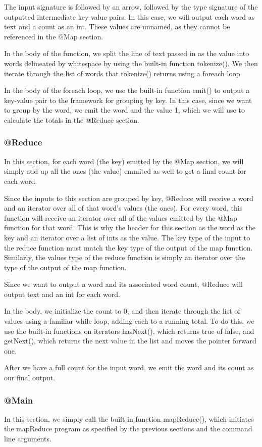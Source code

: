 \documentclass{article}
\begin{document}
The input signature is followed by an arrow, followed by the type signature of the outputted intermediate key-value pairs. In this case, we will output each word as text and a count as an int. These values are unnamed, as they cannot be referenced in the @Map section.

In the body of the function, we split the line of text passed in as the value into words delineated by whitespace by using the built-in function tokenize(). We then iterate through the list of words that tokenize() returns using a foreach loop. 

In the body of the foreach loop, we use the built-in function emit() to output a key-value pair to the framework for grouping by key. In this case, since we want to group by the word, we emit the word and the value 1, which we will use to calculate the totals in the @Reduce section.

\subsubsection*{@Reduce}
In this section, for each word (the key) emitted by the @Map section, we will simply add up all the ones (the value) emmited as well to get a final count for each word. 

Since the inputs to this section are grouped by key, @Reduce will receive a word and an iterator over all of that word's values (the ones). For every word, this function will receive an iterator over all of the values emitted by the @Map function for that word. This is why the header for this section as the word as the key and an iterator over a list of ints as the value. The key type of the input to the reduce function must match the key type of the output of the map function. Similarly, the values type of the reduce function is simply an iterator over the type of the output of the map function.

Since we want to output a word and its associated word count, @Reduce will output text and an int for each word.

In the body, we initialize the count to 0, and then iterate through the list of values using a familiar while loop, adding each to a running total. To do this, we use the built-in functions on iterators hasNext(), which returns true of false, and getNext(), which returns the next value in the list and moves the pointer forward one. 

After we have a full count for the input word, we emit the word and its count as our final output.

\subsubsection*{@Main}
In this section, we simply call the built-in function mapReduce(), which initiates the mapReduce program as specified by the previous sections and the command line arguments.
\end{document}
